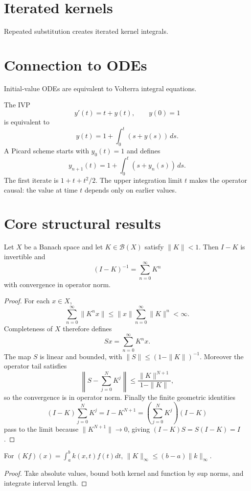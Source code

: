 \section{Iterated kernels}
Repeated substitution creates iterated kernel integrals.

\section{Connection to ODEs}
Initial-value ODEs are equivalent to Volterra integral equations.


\begin{example}\label{ex:ii18-expand-03}
The IVP
\[
y'(t)=t+y(t),\qquad y(0)=1
\]
is equivalent to
\[
y(t)=1+\int_0^t(s+y(s))\,ds.
\]
A Picard scheme starts with \(y_0(t)=1\) and defines
\[
y_{n+1}(t)=1+\int_0^t(s+y_n(s))\,ds.
\]
The first iterate is \(1+t+t^2/2\). The upper integration limit \(t\) makes the
operator causal: the value at time \(t\) depends only on earlier values.
\end{example}
\section{Core structural results}

\begin{theorem}\label{thm:ii18-01}
Let $X$ be a Banach space and let $K\in\mathcal B(X)$ satisfy $\|K\|<1$. Then $I-K$ is invertible and
\[
(I-K)^{-1}=\sum_{n=0}^{\infty}K^n
\]
with convergence in operator norm.
\begin{proof}
For each $x\in X$,
\[
\sum_{n=0}^{\infty}\|K^nx\|\le \|x\|\sum_{n=0}^{\infty}\|K\|^n<\infty.
\]
Completeness of $X$ therefore defines
\[
Sx=\sum_{n=0}^{\infty}K^nx.
\]
The map $S$ is linear and bounded, with $\|S\|\le(1-\|K\|)^{-1}$. Moreover the operator tail satisfies
\[
\left\|S-\sum_{j=0}^N K^j\right\|\le\frac{\|K\|^{N+1}}{1-\|K\|},
\]
so the convergence is in operator norm. Finally the finite geometric identities
\[
(I-K)\sum_{j=0}^N K^j=I-K^{N+1}
=\left(\sum_{j=0}^N K^j\right)(I-K)
\]
pass to the limit because $\|K^{N+1}\|\to0$, giving $(I-K)S=S(I-K)=I$.
\end{proof}
\end{theorem}

\begin{theorem}\label{thm:ii18-02}
For $(Kf)(x)=\int_a^b k(x,t)f(t)dt$, $\|K\|_\infty\le(b-a)\|k\|_\infty$.
\begin{proof}
Take absolute values, bound both kernel and function by sup norms, and integrate interval length.
\end{proof}
\end{theorem}

